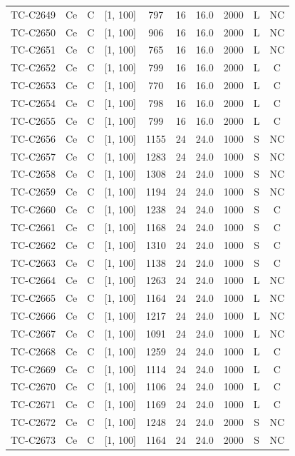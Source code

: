 \begin{longtable}{lccccccccc}
TC-C2649 & Ce & C & [1, 100] & 797 & 16 & 16.0 & 2000 & L & NC \\
TC-C2650 & Ce & C & [1, 100] & 906 & 16 & 16.0 & 2000 & L & NC \\
TC-C2651 & Ce & C & [1, 100] & 765 & 16 & 16.0 & 2000 & L & NC \\
TC-C2652 & Ce & C & [1, 100] & 799 & 16 & 16.0 & 2000 & L & C \\
TC-C2653 & Ce & C & [1, 100] & 770 & 16 & 16.0 & 2000 & L & C \\
TC-C2654 & Ce & C & [1, 100] & 798 & 16 & 16.0 & 2000 & L & C \\
TC-C2655 & Ce & C & [1, 100] & 799 & 16 & 16.0 & 2000 & L & C \\
TC-C2656 & Ce & C & [1, 100] & 1155 & 24 & 24.0 & 1000 & S & NC \\
TC-C2657 & Ce & C & [1, 100] & 1283 & 24 & 24.0 & 1000 & S & NC \\
TC-C2658 & Ce & C & [1, 100] & 1308 & 24 & 24.0 & 1000 & S & NC \\
TC-C2659 & Ce & C & [1, 100] & 1194 & 24 & 24.0 & 1000 & S & NC \\
TC-C2660 & Ce & C & [1, 100] & 1238 & 24 & 24.0 & 1000 & S & C \\
TC-C2661 & Ce & C & [1, 100] & 1168 & 24 & 24.0 & 1000 & S & C \\
TC-C2662 & Ce & C & [1, 100] & 1310 & 24 & 24.0 & 1000 & S & C \\
TC-C2663 & Ce & C & [1, 100] & 1138 & 24 & 24.0 & 1000 & S & C \\
TC-C2664 & Ce & C & [1, 100] & 1263 & 24 & 24.0 & 1000 & L & NC \\
TC-C2665 & Ce & C & [1, 100] & 1164 & 24 & 24.0 & 1000 & L & NC \\
TC-C2666 & Ce & C & [1, 100] & 1217 & 24 & 24.0 & 1000 & L & NC \\
TC-C2667 & Ce & C & [1, 100] & 1091 & 24 & 24.0 & 1000 & L & NC \\
TC-C2668 & Ce & C & [1, 100] & 1259 & 24 & 24.0 & 1000 & L & C \\
TC-C2669 & Ce & C & [1, 100] & 1114 & 24 & 24.0 & 1000 & L & C \\
TC-C2670 & Ce & C & [1, 100] & 1106 & 24 & 24.0 & 1000 & L & C \\
TC-C2671 & Ce & C & [1, 100] & 1169 & 24 & 24.0 & 1000 & L & C \\
TC-C2672 & Ce & C & [1, 100] & 1248 & 24 & 24.0 & 2000 & S & NC \\
TC-C2673 & Ce & C & [1, 100] & 1164 & 24 & 24.0 & 2000 & S & NC \\

\end{longtable}
